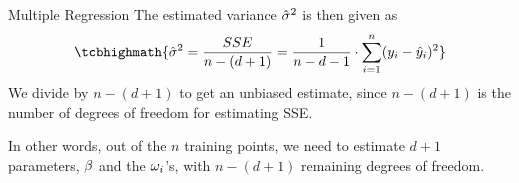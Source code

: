\begin{frame}{Multiple Regression}
%
The estimated variance $\hat{\sigma}^2$ is then given as
\begin{align*}
    \tcbhighmath{
    \hsigma^2 = \frac{SSE}{n-(d+1)} = \frac{1}{n-d-1} \cdot \sum_{i=1}^n (y_i
- \hy_i)^2}
\end{align*}
We divide by $n-(d+1)$ to get an unbiased estimate, 
since $n-(d+1)$ is the number of degrees of freedom for
estimating SSE. %

\medskip

In other words, out of the $n$ training points, we need
to estimate $d+1$ parameters, $\beta$ and the $\omega_i$'s, 
with $n-(d+1)$ remaining degrees of
freedom.
\end{frame}
%

